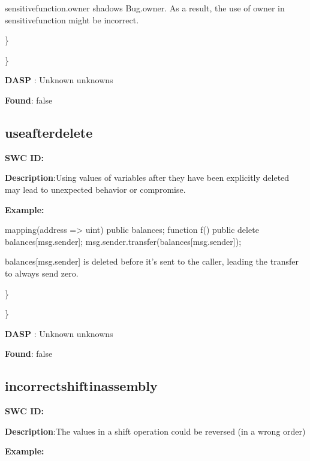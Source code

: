 \documentclass{article}
\begin{document}
sensitive\textunderscore function.owner shadows Bug.owner. As a result, the use of owner in sensitive\textunderscore function might be incorrect.

\} 

\} 

\textbf{DASP} : Unknown unknowns

\textbf{Found}: false

\subsection{use\textunderscore after\textunderscore delete} 
\textbf{SWC \textunderscore ID:} 

\textbf{Description}:Using values of variables after they have been explicitly deleted may lead to unexpected behavior or compromise.


\textbf{Example:} 

mapping(address => uint) public balances;
function f() public {
    delete balances[msg.sender];
    msg.sender.transfer(balances[msg.sender]);
}

balances[msg.sender] is deleted before it's sent to the caller, leading the transfer to always send zero.

\} 

\} 

\textbf{DASP} : Unknown unknowns

\textbf{Found}: false

\subsection{incorrect\textunderscore shift\textunderscore in\textunderscore assembly} 
\textbf{SWC \textunderscore ID:} 

\textbf{Description}:The values in a shift operation could be reversed (in a wrong order)


\textbf{Example:} 
\end{document}
